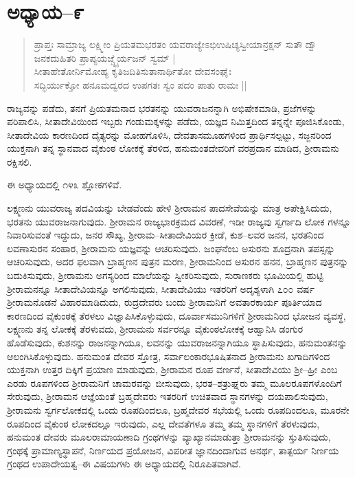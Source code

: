 \section{ಅಧ್ಯಾಯ–೯}

\begin{verse}
ಪ್ರಾಪ್ತಃ ಸಾಮ್ರಾಜ್ಯ ಲಕ್ಷ್ಮೀಂ ಪ್ರಿಯತಮಭರತಂ ಯವರಾಜ್ಯೇಽಭಿಉಷಿಚ್ಯಸ್ವೀಯಾನ್ರಕ್ಷನ್ ಸುತೌ ದ್ವೌ ಜನಕದುಹಿತರಿ ಪ್ರಾಪ್ಯಯಜ್ಚ್ನೈರ್ಯಜನ್ ಸ್ವಮ್ |\\ ಸೀತಾಹೇತೋರ್ನಿಮೋಹ್ಯ ಕೃತಿಜದಿತಿಸುತಾನಾರ್ಥಿತೋ ದೇವಸಂಘೈಃ \\ ಸದ್ಭಿರ್ಯುಕ್ತೋ ಹನೂಮದ್ವರದ ಉಪಗತಃ ಸ್ವಂ ಪದಂ ಪಾತು ರಾಮಃ ||
\end{verse}

ರಾಜ್ಯವನ್ನು ಪಡೆದು, ತನಗೆ ಪ್ರಿಯತಮನಾದ ಭರತನನ್ನು ಯುವರಾಜನನ್ನಾಗಿ ಅಭಿಷೇಕಮಾಡಿ, ಪ್ರಜೆಗಳನ್ನು ಪರಿಪಾಲಿಸಿ, ಸೀತಾದೇವಿಯಿಂದ ಇಬ್ಬರು ಗಂಡುಮಕ್ಕಳನ್ನು ಪಡೆದು, ಯಜ್ಞದ ನಿಮಿತ್ತದಿಂದ ತನ್ನನ್ನೇ ಪೂಜಿಸಿಕೊಂಡು, ಸೀತಾದೇವಿಯ ಕಾರಣದಿಂದ ದೈತ್ಯರನ್ನು ಮೋಹಗೊಳಿಸಿ, ದೇವತಾಸಮೂಹಗಳಿಂದ ಪ್ರಾರ್ಥಿಸಲ್ಪಟ್ಟು, ಸಜ್ಜನರಿಂದ ಯುಕ್ತನಾಗಿ ತನ್ನ ಸ್ಥಾನವಾದ ವೈಕುಂಠ ಲೋಕಕ್ಕೆ ತೆರಳಿದ, ಹನುಮಂತದೇವರಿಗೆ ವರಪ್ರದಾನ ಮಾಡಿದ, ಶ‍್ರೀರಾಮನು ರಕ್ಷಿಸಲಿ.

ಈ ಅಧ್ಯಾಯದಲ್ಲಿ ೧೪೩ ಶ್ಲೋಕಗಳಿವೆ.

ಲಕ್ಷ್ಮಣನು ಯುವರಾಜ್ಯ ಪದವಿಯನ್ನು ಬೇಡವೆಂದು ಹೇಳಿ ಶ‍್ರೀರಾಮನ ಪಾದಸೇವೆಯನ್ನು ಮಾತ್ರ ಅಪೇಕ್ಷಿಸಿದುದು, ಭರತನು ಯುವರಾಜನಾಗುವುದು. ಶ‍್ರೀರಾಮನ ರಾಜ್ಯಭಾರಕ್ರಮದ ವಿವರಣೆ, ಇಡೀ ರಾಜ್ಯವು ಸ್ವರ್ಗಾದಿ ಲೋಕ ಗಳನ್ನೂ ನಿವಾರಿಸುವಂತೆ ಇದ್ದುದು, ಜನರ ಸೌಖ್ಯ, ಶ‍್ರೀರಾಮ–ಸೀತಾದೇವಿಯರ ಕ್ರೀಡೆ, ಕುಶ–ಲವರ ಜನನ, ಭರತನಿಂದ ಲವಣಾಸುರನ ಸಂಹಾರ, ಶ‍್ರೀರಾಮನು ಯಜ್ಞವನ್ನು ಆಚರಿಸುವುದು. ಜಂಘನೆಂಬ ಅಸುರನು ಶೂದ್ರನಾಗಿ ತಪಸ್ಸನ್ನು ಆಚರಿಸುವುದು, ಅದರ ಫಲವಾಗಿ ಬ್ರಾಹ್ಮಣನ ಪುತ್ರನ ಮರಣ, ಶ‍್ರೀರಾಮನಿಂದ ಅಸುರನ ಹನನ, ಬ್ರಾಹ್ಮಣನ ಪುತ್ರನನ್ನು ಬದುಕಿಸುವುದು, ಶ‍್ರೀರಾಮನು ಅಗಸ್ಯರಿಂದ ಮಾಲೆಯನ್ನು ಸ್ವೀಕರಿಸುವುದು, ಸುರಾಣಕರು ಭೂಮಿಯಲ್ಲಿ ಹುಟ್ಟಿ ಶ‍್ರೀರಾಮನನ್ನೂ ಸೀತಾದೇವಿಯನ್ನೂ ಅಗಲಿಸುವುದು, ಸೀತಾದೇವಿಯು ಇತರರಿಗೆ ಅದೃಶ್ಯಳಾಗಿ ೭೦೦ ವರ್ಷ ಶ‍್ರೀರಾಮನೊಡನೆ ವಿಹಾರಮಾಡಿದುದು, ರುದ್ರದೇವರು ಬಂದು ಶ‍್ರೀರಾಮನಿಗೆ ಅವತಾರಕಾರ್ಯ ಪೂರ್ತಿಯಾದ ಕಾರಣದಿಂದ ವೈಕುಂಠಕ್ಕೆ ತೆರಳಲು ವಿಜ್ಞಾಪಿಸಿಕೊಳ್ಳುವುದು, ದೂರ್ವಾಸಮುನಿಗಳಿಗೆ ಶ‍್ರೀರಾಮನಿಂದ ಭೋಜನ ವ್ಯವಸ್ಥೆ, ಲಕ್ಷ್ಮಣನು ತನ್ನ ಲೋಕಕ್ಕೆ ತೆರಳುವದು, ಶ‍್ರೀರಾಮನು ಸರ್ವರನ್ನೂ ವೈಕುಂಠಲೋಕಕ್ಕೆ ಆಹ್ವಾನಿಸಿ ಡಂಗುರ ಹೊಡೆಸುವುದು, ಕುಶನನ್ನು ರಾಜನನ್ನಾಗಿಯೂ, ಲವನನ್ನು ಯುವರಾಜನನ್ನಾಗಿಯೂ ಸ್ಥಾಪಿಸುವುದು, ಹನುಮಂತನನ್ನು ಆಲಂಗಿಸಿಕೊಳ್ಳುವುದು. ಹನುಮಂತ ದೇವರ ಸ್ತೋತ್ರ, ಸರ್ವಾಲಂಕಾರಭೂಷಿತನಾದ ಶ‍್ರೀರಾಮನು ಖಗಾದಿಗಳಿಂದ ಯುಕ್ತನಾಗಿ ಉತ್ತರ ದಿಕ್ಕಿಗೆ ಪ್ರಯಾಣ ಮಾಡುವುದು, ಶ‍್ರೀರಾಮನ ರೂಪ ವರ್ಣನೆ, ಸೀತಾದೇವಿಯು ಶ‍್ರೀ–ಹ್ರೀ ಎಂಬ ಎರಡು ರೂಪಗಳಿಂದ ಶ‍್ರೀರಾಮನಿಗೆ ಚಾಮರವನ್ನು ಬೀಸುವುದು, ಭರತ–ಶತ್ರುಘ್ನರು ತಮ್ಮ ಮೂಲರೂಪಗಳೊಂದಿಗೆ ಸೇರುವುದು, ಶ‍್ರೀರಾಮನ ಆಜ್ಞೆಯಂತೆ ಬ್ರಹ್ಮದೇವರು ಇತರರಿಗೆ ಉಚಿತವಾದ ಸ್ಥಾನಗಳನ್ನು ದಯಪಾಲಿಸುವುದು, ಶ‍್ರೀರಾಮನು ಸ್ವರ್ಗಲೋಕದಲ್ಲಿ ಒಂದು ರೂಪದಿಂದಲೂ, ಬ್ರಹ್ಮದೇವರ ಸಭೆಯಲ್ಲಿ ಒಂದು ರೂಪದಿಂದಲೂ, ಮೂರನೇ ರೂಪದಿಂದ ವೈಕುಂಠ ಲೋಕದಲ್ಲೂ ಇರುವುದು, ಎಲ್ಲ ದೇವತೆಗಳೂ ತಮ್ಮ ತಮ್ಮ ಸ್ಥಾನಗಳಿಗೆ ತೆರಳುವುದು, ಹನುಮಂತ ದೇವರು ಮೂಲರಾಮಾಯಣಾದಿ ಗ್ರಂಥಗಳನ್ನು ವ್ಯಾಖ್ಯಾನಮಾಡುತ್ತಾ ಶ‍್ರೀರಾಮನನ್ನು ಸ್ತುತಿಸುವುದು, ಗ್ರಂಥಕ್ಕೆ ಪ್ರಾಮಾಣ್ಯಸ್ಥಾಪನೆ, ನಿರ್ಣಯದ ಪ್ರಯೋಜನ, ವಿಪರೀತ ಜ್ಞಾನದಿಂದಾಗುವ ಅನರ್ಥ, ತಾತ್ಪರ್ಯ ನಿರ್ಣಯ ಗ್ರಂಥದ ಉಪಾದೇಯತ್ವ–ಈ ವಿಷಯಗಳು ಈ ಅಧ್ಯಾಯದಲ್ಲಿ ನಿರೂಪಿತವಾಗಿವೆ.


